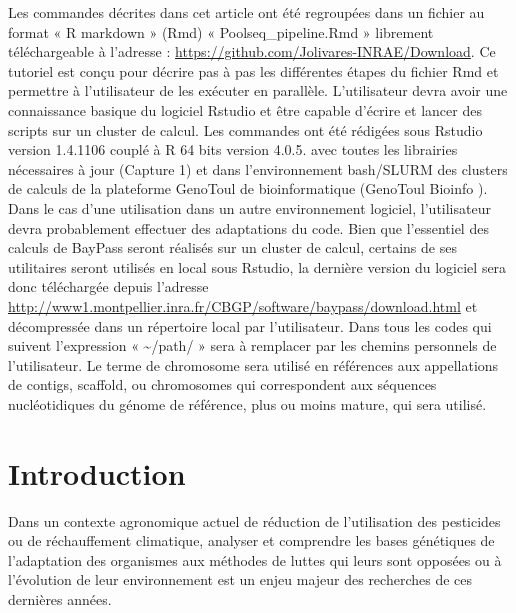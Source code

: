 \documentclass[
  openany]{book}
\theoremstyle{definition}
\theoremstyle{definition}
\theoremstyle{definition}
\theoremstyle{definition}
\theoremstyle{remark}
\begin{document}
Les commandes décrites dans cet article ont été regroupées dans un fichier au format « R markdown » (Rmd) « Poolseq\_pipeline.Rmd » librement téléchargeable à l'adresse : \url{https://github.com/Jolivares-INRAE/Download}. Ce tutoriel est conçu pour décrire pas à pas les différentes étapes du fichier Rmd et permettre à l'utilisateur de les exécuter en parallèle.
L'utilisateur devra avoir une connaissance basique du logiciel Rstudio et être capable d'écrire et lancer des scripts sur un cluster de calcul.
Les commandes ont été rédigées sous Rstudio version 1.4.1106 couplé à R 64 bits version 4.0.5. avec toutes les librairies nécessaires à jour (Capture 1) et dans l'environnement bash/SLURM des clusters de calculs de la plateforme GenoToul de bioinformatique (GenoToul Bioinfo ). Dans le cas d'une utilisation dans un autre environnement logiciel, l'utilisateur devra probablement effectuer des adaptations du code.
Bien que l'essentiel des calculs de BayPass seront réalisés sur un cluster de calcul, certains de ses utilitaires seront utilisés en local sous Rstudio, la dernière version du logiciel sera donc téléchargée depuis l'adresse \url{http://www1.montpellier.inra.fr/CBGP/software/baypass/download.html} et décompressée dans un répertoire local par l'utilisateur.
Dans tous les codes qui suivent l'expression « \textasciitilde/path/ » sera à remplacer par les chemins personnels de l'utilisateur.
Le terme de chromosome sera utilisé en références aux appellations de contigs, scaffold, ou chromosomes qui correspondent aux séquences nucléotidiques du génome de référence, plus ou moins mature, qui sera utilisé.

\hypertarget{introduction}{%
\chapter*{Introduction}\label{introduction}}

Dans un contexte agronomique actuel de réduction de l'utilisation des pesticides ou de réchauffement climatique, analyser et comprendre les bases génétiques de l'adaptation des organismes aux méthodes de luttes qui leurs sont opposées ou à l'évolution de leur environnement est un enjeu majeur des recherches de ces dernières années.
\end{document}
